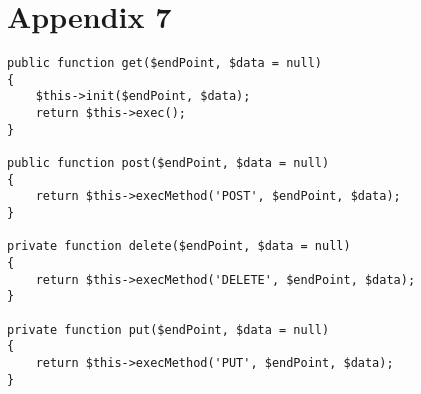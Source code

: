 \section*{Appendix 7}
\label{sec:app7}

\begin{lstlisting}
public function get($endPoint, $data = null)
{
    $this->init($endPoint, $data);
    return $this->exec();
}

public function post($endPoint, $data = null)
{
    return $this->execMethod('POST', $endPoint, $data);
}

private function delete($endPoint, $data = null)
{
    return $this->execMethod('DELETE', $endPoint, $data);
}

private function put($endPoint, $data = null)
{
    return $this->execMethod('PUT', $endPoint, $data);
}

\end{lstlisting}